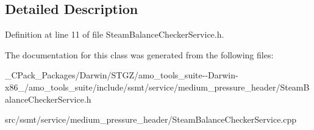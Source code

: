 \subsection{Detailed Description}


Definition at line 11 of file Steam\+Balance\+Checker\+Service.\+h.



The documentation for this class was generated from the following files\+:\begin{DoxyCompactItemize}
\item 
\+\_\+\+C\+Pack\+\_\+\+Packages/\+Darwin/\+S\+T\+G\+Z/amo\+\_\+tools\+\_\+suite-\/-\/\+Darwin-\/x86\+\_/amo\+\_\+tools\+\_\+suite/include/ssmt/service/medium\+\_\+pressure\+\_\+header/Steam\+Balance\+Checker\+Service.\+h\item 
src/ssmt/service/medium\+\_\+pressure\+\_\+header/Steam\+Balance\+Checker\+Service.\+cpp\end{DoxyCompactItemize}
